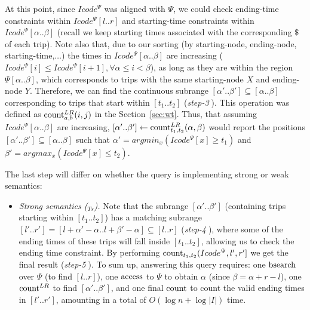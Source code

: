\begin{itemize}
		At this point, since $Icode^{\Psi}$  was aligned with $\Psi$, 
		we could check ending-time constraints within $Icode^{\Psi}[l..r]$  and starting-time constraints 
		within $Icode^{\Psi}[\alpha..\beta]$ (recall we keep starting times associated with the corresponding $\$$ of each trip).
		Note also that, due to our sorting (by starting-node, ending-node, starting-time,$\dots$) the times in $Icode^{\Psi}[\alpha..\beta]$ are 
		increasing ($Icode^{\Psi}[i] \leq Icode^{\Psi}[i+1], \forall \alpha \leq i < \beta$), as long as they are within the region $\Psi[\alpha..\beta]$, which corresponds to trips with the same starting-node $X$ and ending-node $Y$.
		Therefore, we can find the continuous subrange $[\alpha'..\beta'] \subseteq [\alpha..\beta] $ corresponding to trips
		that start within $[t_1..t_2]$ ({\em step-\textcircled{3}}).
		This operation was defined as $\operatorname{count}^{LR}_{a, b}(i,j)$ in the Section~\ref{sec:wt}.
		Thus, that assuming $Icode^{\Psi}[\alpha..\beta]$ are increasing,  
		$[\alpha'..\beta'] \leftarrow \operatorname{count}^{LR}_{t_1,t_2}(\alpha,\beta)$ would report the 
		positions $[\alpha'..\beta'] \subseteq [\alpha..\beta]$ such that $\alpha' = argmin_{x} (Icode^{\Psi}[x] \geq t_1)$ and
		$\beta' = argmax_{x} (Icode^{\Psi}[x] \leq t_2)$.
		
		
		The last step will differ on whether the query is implementing strong or weak semantics:
		
		\begin{itemize}
			\item {\em Strong semantics (\XtoY$_{Ts}$).} Note that the subrange $[\alpha'..\beta']$ (containing trips starting within $[t_1..t_2]$) 
			has a matching subrange $[l'..r'] = [l+\alpha'-\alpha..l+\beta'-\alpha] \subseteq [l..r]$ ({\em step-\textcircled{4}}), where some of the ending times of these trips will fall inside 
			$[t_1..t_2]$, allowing us to check the ending time constraint. By performing  $\operatorname{count}_{t_1,t_2}(Icode^{\Psi},l',r']$  we get the final result 
			({\em step-\textcircled{5}}). 
			To sum up, answering this query  requires: one $\operatorname{bsearch}$ over $\Psi$ (to find $[l..r]$), one $\operatorname{access}$ to $\Psi$ to obtain
			 $\alpha$ (since $\beta = \alpha+r-l$), one $\operatorname{count}^{LR}$ to find $[\alpha'..\beta']$, and one final $\operatorname{count}$ to count the valid ending times in $[l'..r']$, amounting in a total of $O(\log n + \log|I|)$ time.
			

\end{itemize}
\end{itemize}

